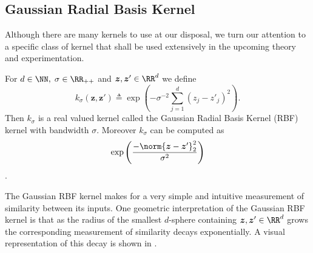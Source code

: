 \subsection{Gaussian Radial Basis Kernel}\label{Section1.3}

Although there are many kernels to use at our disposal, we turn our attention to a specific class of kernel that shall be used extensively in the upcoming theory and experimentation.

\begin{defe} \label{defe: grbfk}
    For $d \in \NN, \; \sigma \in \RR_{++}$ and $ \bm{z} , \bm{z}' \in \RR^d$ we define
    \[
        k_\sigma \left( \bm{z} , \bm{z}' \right) \triangleq \exp \left( - \sigma^{-2} \sum_{j=1}^{d} \left( {z}_j - {{z}'}_j \right)^2 \right).
    \]
    Then $k_\sigma$ is a real valued kernel called the Gaussian Radial Basis Kernel (RBF) kernel with bandwidth $\sigma$. Moreover $k_\sigma$ can be computed as
    \[
        \exp \left( \frac{- \norm{\bm{z} - {\bm{z}'}}_{2}^{2}}{\sigma^2} \right)
    \]
    \cite{SteinwartIngo2008SVMb}.
\end{defe}
The Gaussian RBF kernel makes for a very simple and intuitive measurement of similarity between its inputs. One geometric interpretation of the Gaussian RBF kernel is that as the radius of the smallest $d$-sphere containing $\bm{z} , \bm{z}' \in \RR^d$ grows the corresponding measurement of similarity decays exponentially. A visual representation of this decay is shown in .

